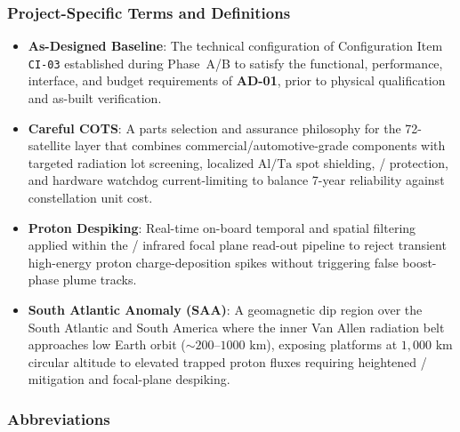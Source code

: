 \subsubsection{Project-Specific Terms and Definitions}

\begin{itemize}[leftmargin=1.5em, itemsep=0.25em, topsep=0.2em]
    \item \textbf{As-Designed Baseline}: The technical configuration of Configuration Item \texttt{CI-03} established during Phase~A/B to satisfy the functional, performance, interface, and budget requirements of \textbf{AD-01}, prior to physical qualification and as-built verification.
    \item \textbf{Careful COTS}: A parts selection and assurance philosophy for the 72-satellite   layer that combines commercial/automotive-grade components with targeted radiation lot screening, localized \(\mathrm{Al}/\mathrm{Ta}\) spot shielding, / protection, and hardware watchdog  current-limiting to balance 7-year reliability against constellation unit cost.
    \item \textbf{Proton Despiking}: Real-time on-board temporal and spatial filtering applied within the / infrared focal plane read-out pipeline to reject transient high-energy proton charge-deposition spikes without triggering false boost-phase plume tracks.
    \item \textbf{South Atlantic Anomaly (SAA)}: A geomagnetic dip region over the South Atlantic and South America where the inner Van Allen radiation belt approaches low Earth orbit (\(\sim 200\text{--}1000\text{ km}\)), exposing  platforms at \(1{,}000\text{ km}\) circular altitude to elevated trapped proton fluxes requiring heightened / mitigation and focal-plane despiking.
\end{itemize}

\subsubsection{Abbreviations}

